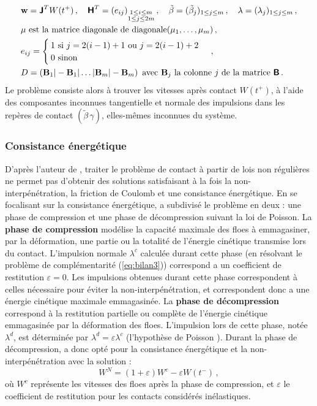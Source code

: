 \begin{align*}
    &\bm{\mathrm{w}} = \bm{\mathsf{J}}^T W(t^+) \,, \quad
    \bm{\mathsf{H}}^T = (e_{ij})_{\substack{1 \leq i \leq m \\ 1 \leq j \leq 2m}} \,, \quad \tilde{\beta} = (\tilde{\beta}_j)_{1\leq j \leq m} \,, \quad \lambda = (\lambda_j)_{1 \leq j \leq m} \,, \\
    &\mu \text{ est la matrice diagonale de diagonale} (\mu_1,\dots, \mu_m) \,,\\
    &e_{ij} = \begin{cases}
        1 \text{   si } j = 2(i-1) + 1 \text{ ou } j=2(i-1) + 2 \\
        0 \text{   sinon} 
    \end{cases} \,,\\
    &D = (\bm{\mathrm{B}}_1 \vert - \bm{\mathrm{B}}_1 \vert \ldots \vert \bm{\mathrm{B}}_m \vert -\bm{\mathrm{B}}_m) \, \text{   avec } \bm{\mathrm{B}}_j \text{ la colonne } j \text{ de la matrice } \bm{\mathsf{B}} \,.
\end{align*}
Le problème consiste alors à trouver les vitesses après contact $W(t^{+})$, à l’aide des composantes inconnues tangentielle et normale des impulsions dans les repères de contact $(\tilde{\beta}\, \gamma)$, elles-mêmes inconnues du système.


\subsubsection{Consistance énergétique}


D'après l'auteur de \parencite[p.42]{rabatel2015thesis}, traiter le problème de contact à partir de lois non régulières ne permet pas d’obtenir des solutions satisfaisant à la fois la non-interpénétration, la friction de Coulomb et une consistance énergétique. En se focalisant sur la consistance énergétique, \citeauthor{rabatel2015thesis} a subdivisé le problème en deux : une phase de compression et une phase de décompression suivant la loi de Poisson. La \textbf{phase de compression} modélise la capacité maximale des floes à emmagasiner, par la déformation, une partie ou la totalité de l’énergie cinétique transmise lors du contact. L'impulsion normale $\lambda^c$ calculée durant cette phase (en résolvant le problème de complémentarité (\cref{eq:bilan3})) correspond a un coefficient de restitution $\varepsilon = 0$. Les impulsions obtenues durant cette phase correspondent à celles nécessaire pour éviter la non-interpénétration, et correspondent donc a une énergie cinétique maximale emmagasinée. La \textbf{phase de décompression} correspond à la restitution partielle ou complète de l’énergie cinétique emmagasinée par la déformation des floes. L’impulsion lors de cette phase, notée $\lambda^d$, est déterminée par $\lambda^d = \varepsilon \lambda^c$ (l’hypothèse de Poisson \parencite{glocker1995multiple}). Durant la phase de décompression, \citeauthor{rabatel2015thesis} a donc opté pour la consistance énergétique et la non-interpénétration avec la solution :
$$
W^N = (1 + \varepsilon)W^{c} - \varepsilon W(t^{-}) \,,
$$
où $W^c$ représente les vitesses des floes après la phase de compression, et $\varepsilon$ le coefficient de restitution pour les contacts considérés inélastiques.

